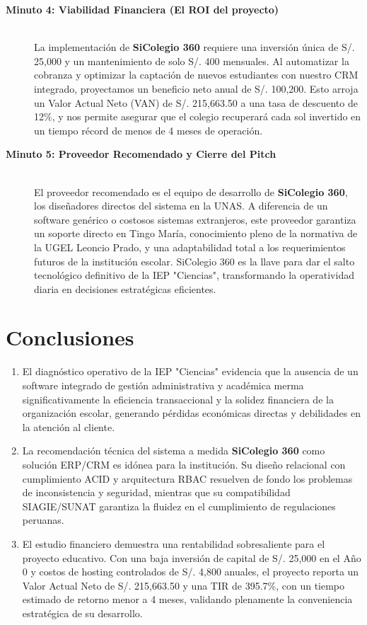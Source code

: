 \documentclass[12pt,a4paper,oneside]{report}
\begin{document}
\begin{description}
    \item[\textbf{Minuto 4: Viabilidad Financiera (El ROI del proyecto)}] \hfill \\
    La implementación de \textbf{SiColegio 360} requiere una inversión única de S/. 25,000 y un mantenimiento de solo S/. 400 mensuales. Al automatizar la cobranza y optimizar la captación de nuevos estudiantes con nuestro CRM integrado, proyectamos un beneficio neto anual de S/. 100,200. Esto arroja un Valor Actual Neto (VAN) de S/. 215,663.50 a una tasa de descuento de 12\%, y nos permite asegurar que el colegio recuperará cada sol invertido en un tiempo récord de menos de 4 meses de operación.
    
    \item[\textbf{Minuto 5: Proveedor Recomendado y Cierre del Pitch}] \hfill \\
    El proveedor recomendado es el equipo de desarrollo de \textbf{SiColegio 360}, los diseñadores directos del sistema en la UNAS. A diferencia de un software genérico o costosos sistemas extranjeros, este proveedor garantiza un soporte directo en Tingo María, conocimiento pleno de la normativa de la UGEL Leoncio Prado, y una adaptabilidad total a los requerimientos futuros de la institución escolar. SiColegio 360 es la llave para dar el salto tecnológico definitivo de la IEP "Ciencias", transformando la operatividad diaria en decisiones estratégicas eficientes.
\end{description}

\newpage

\chapter*{Conclusiones}

\begin{enumerate}
    \item El diagnóstico operativo de la IEP "Ciencias" evidencia que la ausencia de un software integrado de gestión administrativa y académica merma significativamente la eficiencia transaccional y la solidez financiera de la organización escolar, generando pérdidas económicas directas y debilidades en la atención al cliente.
    \item La recomendación técnica del sistema a medida \textbf{SiColegio 360} como solución ERP/CRM es idónea para la institución. Su diseño relacional con cumplimiento ACID y arquitectura RBAC resuelven de fondo los problemas de inconsistencia y seguridad, mientras que su compatibilidad SIAGIE/SUNAT garantiza la fluidez en el cumplimiento de regulaciones peruanas.
    \item El estudio financiero demuestra una rentabilidad sobresaliente para el proyecto educativo. Con una baja inversión de capital de S/. 25,000 en el Año 0 y costos de hosting controlados de S/. 4,800 anuales, el proyecto reporta un Valor Actual Neto de S/. 215,663.50 y una TIR de 395.7\%, con un tiempo estimado de retorno menor a 4 meses, validando plenamente la conveniencia estratégica de su desarrollo.
\end{enumerate}
\end{document}
